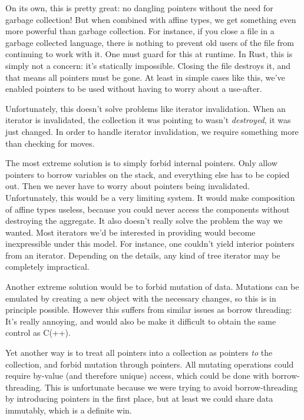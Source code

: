 On its own, this is pretty great: no dangling pointers without the need for
garbage collection! But when combined with affine types,
we get something even more powerful than garbage collection. For instance, if
you close a file in a garbage collected language, there is nothing to prevent
old users of the file from continuing to work with it. One must guard for
this at runtime. In Rust, this is simply not a concern:
it's statically impossible. Closing the file destroys it, and that means all
pointers must be gone. At least in simple cases like this, we've enabled
pointers to be used without having to worry about a use-after.

Unfortunately, this doesn't solve problems like iterator invalidation. When an
iterator is invalidated, the collection it was pointing to wasn't \emph{destroyed},
it was just changed. In order to handle iterator invalidation, we require something
more than checking for moves.

The most extreme solution is to simply forbid internal pointers. Only allow
pointers to borrow variables on the stack, and everything else has to be copied
out. Then we never have to worry about pointers being invalidated. Unfortunately,
this would be a very limiting system. It would make composition of affine types useless,
because you could never access the components without destroying the aggregate.
It also doesn't really solve the problem the way we wanted. Most iterators we'd
be interested in providing would become inexpressible under this model. For
instance, one couldn't yield interior pointers from an iterator. Depending on
the details, any kind of tree iterator may be completely impractical.

Another extreme solution would be to forbid mutation of data. Mutations can be emulated
by creating a new object with the necessary changes, so this is in principle
possible. However this suffers from similar issues as borrow threading: It's
really annoying, and would also be make it difficult to obtain the same
control as C(++).

Yet another way is to treat all pointers into a collection as pointers \emph{to}
the collection, and forbid mutation through pointers. All mutating operations
could require by-value (and therefore unique) access, which could be done with borrow-threading.
This is unfortunate because we were trying to avoid borrow-threading by introducing
pointers in the first place, but at least we could share data immutably,
which is a definite win.

